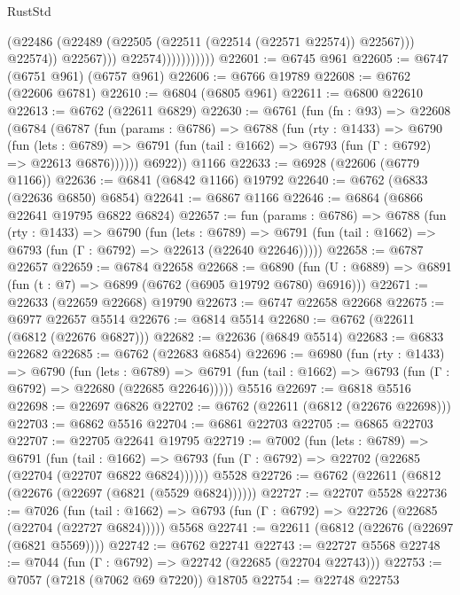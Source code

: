\begin{lexlean}{RustStd}
\begin{coremodule}
                                  (@22486
                                    (@22489 (@22505 (@22511 (@22514 (@22571 @22574)) @22567)))
                                    @22574))
                                @22567)))
                          @22574)))))))))))
@22601 := @6745 @961
@22605 := @6747 (@6751 @961) (@6757 @961)
@22606 := @6766 @19789
@22608 := @6762 (@22606 @6781)
@22610 := @6804 (@6805 @961)
@22611 := @6800 @22610
@22613 := @6762 (@22611 @6829)
@22630 := @6761
    (fun (fn : @93) =>
    @22608
      (@6784
        (@6787
          (fun (params : @6786) =>
          @6788
            (fun (rty : @1433) =>
            @6790
              (fun (lets : @6789) =>
              @6791 (fun (tail : @1662) => @6793 (fun (Γ : @6792) => @22613 @6876))))))
        @6922))
    @1166
@22633 := @6928 (@22606 (@6779 @1166))
@22636 := @6841 (@6842 @1166) @19792
@22640 := @6762 (@6833 (@22636 @6850) @6854)
@22641 := @6867 @1166
@22646 := @6864 (@6866 @22641 @19795 @6822 @6824)
@22657 := fun (params : @6786) =>
  @6788
    (fun (rty : @1433) =>
    @6790
      (fun (lets : @6789) =>
      @6791 (fun (tail : @1662) => @6793 (fun (Γ : @6792) => @22613 (@22640 @22646)))))
@22658 := @6787 @22657
@22659 := @6784 @22658
@22668 := @6890
    (fun (U : @6889) => @6891 (fun (t : @7) => @6899 (@6762 (@6905 @19792 @6780) @6916)))
@22671 := @22633 (@22659 @22668) @19790
@22673 := @6747 @22658 @22668
@22675 := @6977 @22657 @5514
@22676 := @6814 @5514
@22680 := @6762 (@22611 (@6812 (@22676 @6827)))
@22682 := @22636 (@6849 @5514)
@22683 := @6833 @22682
@22685 := @6762 (@22683 @6854)
@22696 := @6980
    (fun (rty : @1433) =>
    @6790
      (fun (lets : @6789) =>
      @6791 (fun (tail : @1662) => @6793 (fun (Γ : @6792) => @22680 (@22685 @22646)))))
    @5516
@22697 := @6818 @5516
@22698 := @22697 @6826
@22702 := @6762 (@22611 (@6812 (@22676 @22698)))
@22703 := @6862 @5516
@22704 := @6861 @22703
@22705 := @6865 @22703
@22707 := @22705 @22641 @19795
@22719 := @7002
    (fun (lets : @6789) =>
    @6791
      (fun (tail : @1662) =>
      @6793 (fun (Γ : @6792) => @22702 (@22685 (@22704 (@22707 @6822 @6824))))))
    @5528
@22726 := @6762 (@22611 (@6812 (@22676 (@22697 (@6821 (@5529 @6824))))))
@22727 := @22707 @5528
@22736 := @7026
    (fun (tail : @1662) => @6793 (fun (Γ : @6792) => @22726 (@22685 (@22704 (@22727 @6824)))))
    @5568
@22741 := @22611 (@6812 (@22676 (@22697 (@6821 @5569))))
@22742 := @6762 @22741
@22743 := @22727 @5568
@22748 := @7044 (fun (Γ : @6792) => @22742 (@22685 (@22704 @22743)))
@22753 := @7057 (@7218 (@7062 @69 @7220)) @18705
@22754 := @22748 @22753

\end{coremodule}
\end{lexlean}
